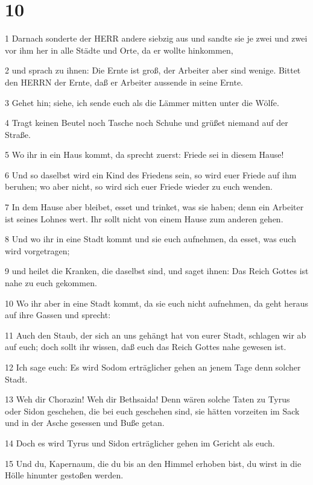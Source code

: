 \chapter{10}

\par 1 Darnach sonderte der HERR andere siebzig aus und sandte sie je zwei und zwei vor ihm her in alle Städte und Orte, da er wollte hinkommen,
\par 2 und sprach zu ihnen: Die Ernte ist groß, der Arbeiter aber sind wenige. Bittet den HERRN der Ernte, daß er Arbeiter aussende in seine Ernte.
\par 3 Gehet hin; siehe, ich sende euch als die Lämmer mitten unter die Wölfe.
\par 4 Tragt keinen Beutel noch Tasche noch Schuhe und grüßet niemand auf der Straße.
\par 5 Wo ihr in ein Haus kommt, da sprecht zuerst: Friede sei in diesem Hause!
\par 6 Und so daselbst wird ein Kind des Friedens sein, so wird euer Friede auf ihm beruhen; wo aber nicht, so wird sich euer Friede wieder zu euch wenden.
\par 7 In dem Hause aber bleibet, esset und trinket, was sie haben; denn ein Arbeiter ist seines Lohnes wert. Ihr sollt nicht von einem Hause zum anderen gehen.
\par 8 Und wo ihr in eine Stadt kommt und sie euch aufnehmen, da esset, was euch wird vorgetragen;
\par 9 und heilet die Kranken, die daselbst sind, und saget ihnen: Das Reich Gottes ist nahe zu euch gekommen.
\par 10 Wo ihr aber in eine Stadt kommt, da sie euch nicht aufnehmen, da geht heraus auf ihre Gassen und sprecht:
\par 11 Auch den Staub, der sich an uns gehängt hat von eurer Stadt, schlagen wir ab auf euch; doch sollt ihr wissen, daß euch das Reich Gottes nahe gewesen ist.
\par 12 Ich sage euch: Es wird Sodom erträglicher gehen an jenem Tage denn solcher Stadt.
\par 13 Weh dir Chorazin! Weh dir Bethsaida! Denn wären solche Taten zu Tyrus oder Sidon geschehen, die bei euch geschehen sind, sie hätten vorzeiten im Sack und in der Asche gesessen und Buße getan.
\par 14 Doch es wird Tyrus und Sidon erträglicher gehen im Gericht als euch.
\par 15 Und du, Kapernaum, die du bis an den Himmel erhoben bist, du wirst in die Hölle hinunter gestoßen werden.
